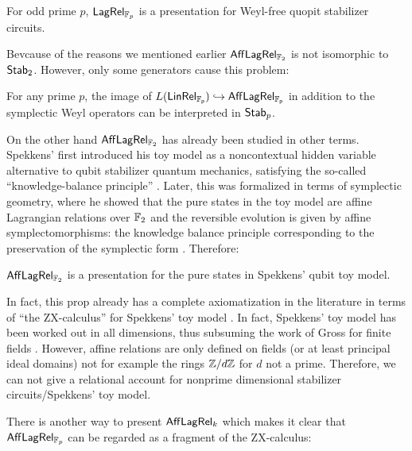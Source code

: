 \begin{corollary}
For odd prime $p$, $\mathsf{Lag}\mathsf{Rel}_{\mathbb{F}_p}$ is a presentation for Weyl-free quopit stabilizer circuits.
\end{corollary}

Bevcause of the reasons we mentioned earlier $\mathsf{Aff}\mathsf{Lag}\mathsf{Rel}_{\mathbb{F}_2}$ is not isomorphic to ${\sf Stab}_2$.  
However, only some generators cause this problem:

\begin{corollary}
\label{cor:nophase}
For any prime $p$, the image of $L(\sf LinRel_{\mathbb{F}_p}) \hookrightarrow \mathsf{Aff}\mathsf{Lag}\mathsf{Rel}_{\mathbb{F}_p}$ in addition to the symplectic Weyl operators can be interpreted in ${\sf Stab}_p$.
\end{corollary}

On the other hand $\mathsf{Aff}\mathsf{Lag}\mathsf{Rel}_{\mathbb{F}_2}$ has already been studied in other terms. Spekkens' first introduced his toy model as a noncontextual hidden variable alternative to qubit stabilizer quantum mechanics, satisfying the so-called ``knowledge-balance principle'' \cite{spekkens}.
Later, this was formalized in terms of symplectic geometry, where he showed that the pure states in the toy model are affine Lagrangian relations over $\mathbb{F}_2$ and the reversible evolution is given by affine symplectomorphisms: the knowledge balance principle corresponding to the preservation of the symplectic form \cite{spekkens2016quasi}.  Therefore:


\begin{corollary}
$\mathsf{Aff}\mathsf{Lag}\mathsf{Rel}_{\mathbb{F}_2}$ is a presentation for the pure states in Spekkens' qubit toy model.
\end{corollary}

In fact, this prop  already has a complete axiomatization in the literature in terms of ``the ZX-calculus'' for Spekkens' toy model \cite{backensspek}.  In fact, Spekkens' toy model has been worked out in all dimensions, thus subsuming the work of Gross for finite fields \cite{catani}. However, affine relations are only defined on fields (or at least principal ideal domains) not for example the rings $\mathbb{Z}/d\mathbb{Z}$ for $d$ not a prime.  Therefore, we can not give a relational account for nonprime dimensional stabilizer circuits/Spekkens' toy model.

There is another way to present $\mathsf{Aff}\mathsf{Lag}\mathsf{Rel}_{k}$ which makes it clear that $\mathsf{Aff}\mathsf{Lag}\mathsf{Rel}_{\mathbb{F}_p}$ can be regarded as a fragment of the ZX-calculus:

